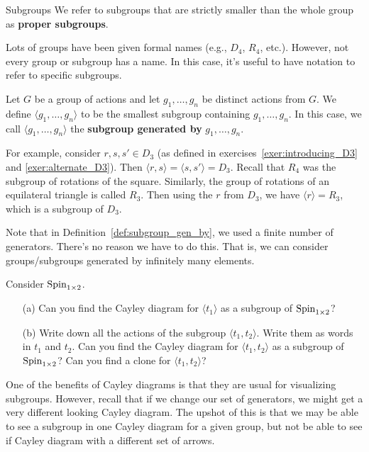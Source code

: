 \begin{section}{Subgroups}
We refer to subgroups that are strictly smaller than the whole group as \textbf{proper subgroups}.

Lots of groups have been given formal names (e.g., \(D_4\), \(R_4\), etc.).  However, not every group or subgroup has a name.  In this case, it's useful to have notation to refer to specific subgroups.

\begin{definition}\label{def:subgroup_gen_by}
Let \(G\) be a group of actions and let \(g_1,\ldots, g_n\) be distinct actions from \(G\).  We define \(\langle g_1,\ldots, g_n\rangle\) to be the smallest subgroup containing \(g_1,\ldots, g_n\).  In this case, we call \(\langle g_1,\ldots, g_n\rangle\) the \textbf{subgroup generated by} \(g_1,\ldots, g_n\).
\end{definition}

For example, consider \(r, s, s'\in D_3\) (as defined in exercises~\ref{exer:introducing_D3} and \ref{exer:alternate_D3}).  Then \(\langle r,s\rangle=\langle s, s'\rangle=D_3\).  Recall that \(R_4\) was the subgroup of rotations of the square.  Similarly, the group of rotations of an equilateral triangle is called \(R_3\).  Then using the \(r\) from \(D_3\), we have \(\langle r\rangle = R_3\), which is a subgroup of \(D_3\).

Note that in Definition~\ref{def:subgroup_gen_by}, we used a finite number of generators.  There's no reason we have to do this.  That is, we can consider groups/subgroups generated by infinitely many elements.

\begin{exercise}
Consider \(\operatorname{Spin}_{1\times 2}\).  
\begin{enumerate}
\item[(a)] Can you find the Cayley diagram for \(\langle t_1\rangle\) as a subgroup of \(\operatorname{Spin}_{1\times 2}\)?
\item[(b)] Write down all the actions of the subgroup \(\langle t_1, t_2\rangle\). Write them as words in \(t_1\) and \(t_2\).  Can you find the Cayley diagram for \(\langle t_1, t_2\rangle\) as a subgroup of \(\operatorname{Spin}_{1\times 2}\)?  Can you find a clone for \(\langle t_1, t_2\rangle\)?
\end{enumerate}
\end{exercise}

One of the benefits of Cayley diagrams is that they are usual for visualizing subgroups.  However, recall that if we change our set of generators, we might get a very different looking Cayley diagram.  The upshot of this is that we may be able to see a subgroup in one Cayley diagram for a given group, but not be able to see if Cayley diagram with a different set of arrows.


\end{section}
